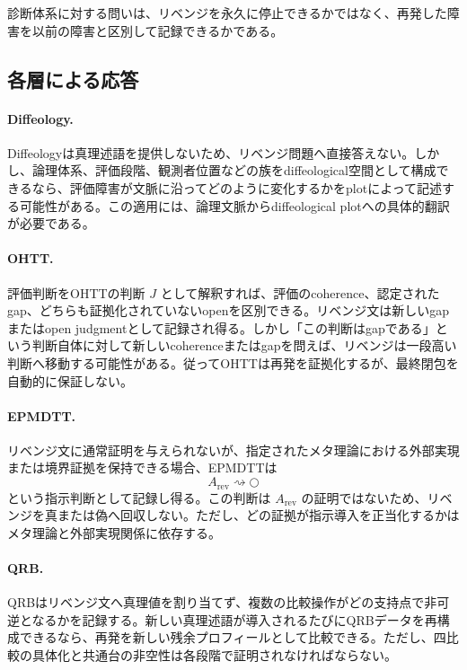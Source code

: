 \documentclass[a4paper,11pt]{ltjsarticle}
\theoremstyle{definition}
\theoremstyle{plain}
\newcommand{\dfix}{\bigcirc}
\begin{document}
診断体系に対する問いは、リベンジを永久に停止できるかではなく、再発した障害を以前の障害と区別して記録できるかである。

\subsection{各層による応答}

\paragraph{Diffeology.}
Diffeologyは真理述語を提供しないため、リベンジ問題へ直接答えない。しかし、論理体系、評価段階、観測者位置などの族をdiffeological空間として構成できるなら、評価障害が文脈に沿ってどのように変化するかをplotによって記述する可能性がある。この適用には、論理文脈からdiffeological plotへの具体的翻訳が必要である。

\paragraph{OHTT.}
評価判断をOHTTの判断 $J$ として解釈すれば、評価のcoherence、認定されたgap、どちらも証拠化されていないopenを区別できる。リベンジ文は新しいgapまたはopen judgmentとして記録され得る。しかし「この判断はgapである」という判断自体に対して新しいcoherenceまたはgapを問えば、リベンジは一段高い判断へ移動する可能性がある。従ってOHTTは再発を証拠化するが、最終閉包を自動的に保証しない。

\paragraph{EPMDTT.}
リベンジ文に通常証明を与えられないが、指定されたメタ理論における外部実現または境界証拠を保持できる場合、EPMDTTは
\begin{equation}
 A_{\mathrm{rev}}\rightsquigarrow\dfix
\end{equation}
という指示判断として記録し得る。この判断は $A_{\mathrm{rev}}$ の証明ではないため、リベンジを真または偽へ回収しない。ただし、どの証拠が指示導入を正当化するかはメタ理論と外部実現関係に依存する。

\paragraph{QRB.}
QRBはリベンジ文へ真理値を割り当てず、複数の比較操作がどの支持点で非可逆となるかを記録する。新しい真理述語が導入されるたびにQRBデータを再構成できるなら、再発を新しい残余プロフィールとして比較できる。ただし、四比較の具体化と共通台の非空性は各段階で証明されなければならない。
\end{document}
